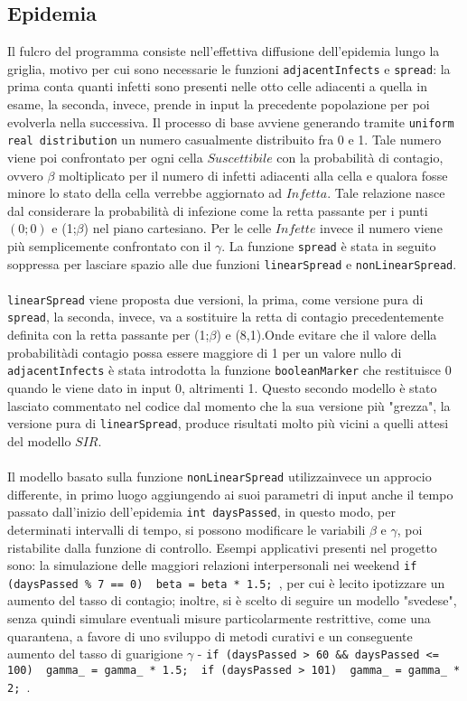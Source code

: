 \documentclass[a4paper]{article}
\begin{document}
\subsection{Epidemia}
Il fulcro del programma consiste nell'effettiva diffusione dell'epidemia lungo la griglia, motivo per cui sono necessarie le funzioni \texttt{adjacentInfects} e \texttt{spread}: la prima conta quanti infetti sono presenti nelle otto celle adiacenti a quella in esame, la seconda, invece, prende in input la precedente popolazione per poi evolverla nella successiva. Il processo di base avviene generando tramite \texttt{uniform real distribution} un numero casualmente distribuito fra 0 e 1. Tale numero viene poi confrontato per ogni cella $Suscettibile$ con la probabilità di contagio, ovvero $\beta$ moltiplicato per il numero di infetti adiacenti alla cella e qualora fosse minore lo stato della cella verrebbe aggiornato ad $Infetta$. Tale relazione nasce dal considerare la probabilità di infezione come la retta passante per i punti $(0;0)$ e (1;$\beta$) nel piano cartesiano. Per le celle $Infette$ invece il numero viene più semplicemente confrontato con il $\gamma$. La funzione \texttt{spread} è stata in seguito soppressa per lasciare spazio alle due funzioni \texttt{linearSpread} e \texttt{nonLinearSpread}.\\ \\ \texttt{linearSpread} viene proposta due versioni, la prima, come versione pura di \texttt{spread}, la seconda, invece, va a sostituire la retta di contagio precedentemente definita con la retta passante per (1;$\beta$) e (8,1).Onde evitare che il valore della probabilitàdi contagio possa essere maggiore di 1 per un valore nullo di \texttt{adjacentInfects} è stata introdotta la funzione \texttt{booleanMarker} che restituisce 0 quando le viene dato in input 0, altrimenti 1. Questo secondo modello è stato lasciato commentato nel codice dal momento che la sua versione più "grezza", la versione pura di \texttt{linearSpread}, produce risultati molto più vicini a quelli attesi del modello $SIR$.\\ \\
Il modello basato sulla funzione \texttt{nonLinearSpread} utilizzainvece un approcio differente, in primo luogo aggiungendo ai suoi parametri di input anche il tempo passato dall'inizio dell'epidemia \texttt{int daysPassed}, in questo modo, per determinati intervalli di tempo, si possono modificare le variabili $\beta$ e $\gamma$, poi ristabilite dalla funzione di controllo. Esempi applicativi presenti nel progetto sono: la simulazione delle maggiori relazioni interpersonali nei weekend \texttt{if (daysPassed \% 7 == 0) { beta = beta * 1.5; }}, per cui è lecito ipotizzare un aumento del tasso di contagio; inoltre, si è scelto di seguire un modello "svedese", senza quindi simulare eventuali misure particolarmente restrittive, come una quarantena, a favore di uno sviluppo di metodi curativi e un conseguente aumento del tasso di guarigione $\gamma$ - 
\texttt{if (daysPassed > 60 && daysPassed <= 100) { gamma_ = gamma_ * 1.5; }
if (daysPassed > 101) { gamma_ = gamma_ * 2; }}.
\end{document}
